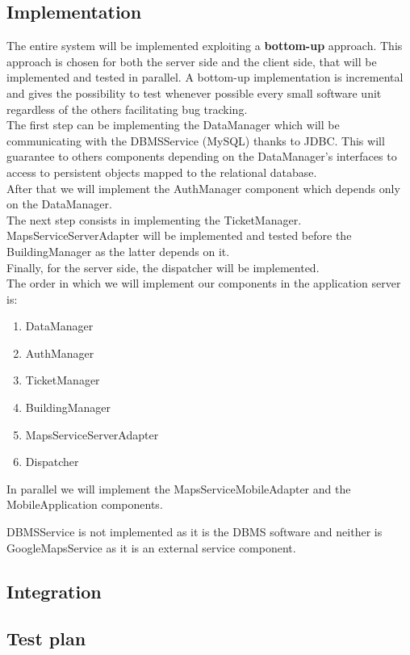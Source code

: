\subsection{Implementation}

The entire system will be implemented exploiting a \textbf{bottom-up} approach. This approach is chosen for both the server side and the client side, that will be implemented and tested in parallel. A bottom-up implementation is incremental and gives the possibility to test whenever possible every small software unit regardless of the others facilitating bug tracking.\\
\newline
The first step can be implementing the DataManager which will be communicating with the DBMSService (MySQL) thanks to JDBC. This will guarantee to others components depending on the DataManager's interfaces to access to persistent objects mapped to the relational database.\\
\newline
After that we will implement the AuthManager component which depends only on the DataManager.\\
The next step consists in implementing the TicketManager.\\
MapsServiceServerAdapter will be implemented and tested before the BuildingManager as the latter depends on it.\\
\newline
Finally, for the server side, the dispatcher will be implemented.\\
\newline
The order in which we will implement our components in the application server is:

\begin{enumerate}[label=\arabic*]
 \item DataManager
 \item AuthManager
 \item TicketManager
 \item BuildingManager
 \item MapsServiceServerAdapter
 \item Dispatcher
\end{enumerate}

In parallel we will implement the MapsServiceMobileAdapter and the MobileApplication components.

DBMSService is not implemented as it is the DBMS software and neither is GoogleMapsService as it is an external service component.




\subsection{Integration}
\subsection{Test plan}
